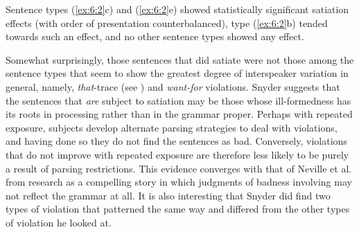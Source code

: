  \noindent
 Sentence types (\ref{ex:6:2}c) and (\ref{ex:6:2}e) showed statistically significant satiation effects (with order of presentation counterbalanced), type (\ref{ex:6:2}b) tended towards such an effect, and no other sentence types showed any effect.

 Somewhat surprisingly, those sentences that did satiate were not those among the sentence types that seem to show the greatest degree of interspeaker variation in general, namely, \textit{that}-trace (see ) and \textit{want-for} violations. Snyder suggests that the sentences that \textit{are} subject to satiation may be those whose ill-formedness has its roots in processing rather than in the grammar proper. Perhaps with repeated exposure, subjects develop alternate parsing strategies to deal with  violations, and having done so they do not find the sentences as bad. Conversely, violations that do not improve with repeated exposure are therefore less likely to be purely a result of parsing restrictions. This evidence converges with that of Neville et al. from  research as a compelling story in which judgments of badness involving  may not reflect the grammar at all. It is also interesting that Snyder did find two types of  violation that patterned the same way and differed from the other types of violation he looked at.

